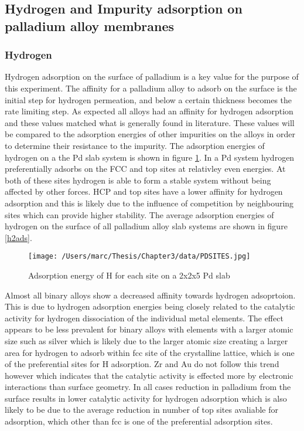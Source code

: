 \subsection{Hydrogen and Impurity adsorption on palladium alloy membranes}\label{Hsection}
\subsubsection{Hydrogen}
Hydrogen adsorption on the surface of palladium is a key value for the purpose of this experiment. The affinity for a palladium alloy to adsorb on the surface is the initial step for hydrogen permeation, and below a certain thickness becomes the rate limiting step. As expected all alloys had an affinity for hydrogen adsorption and these values matched what is generally found in literature. These values will be compared to the adsorption energies of other impurities on the alloys in order to determine their resistance to the impurity. The adsorption energies of hydrogen on a the Pd slab system is shown in figure \ref{Pdsite}. In a Pd system hydrogen preferentially adsorbs on the FCC and top sites at relativley even energies. At both of these sites hydrogen is able to form a stable system without being affected by other forces. HCP and top sites have a  lower affinity for hydrogen adsorption and this is likely due to the influence of competition by neighbouring sites which can provide higher stability. The average adsorption energies of hydrogen on the surface of all palladium alloy slab systems are shown in figure \ref{h2ads}.

\begin{figure}
  \centering
  \texttt{[image: /Users/marc/Thesis/Chapter3/data/PDSITES.jpg]}
  \caption{Adsorption energy of H for each site on a 2x2x5 Pd slab}
  \label{Pdsite}
\end{figure}

Almost all binary alloys show a decreased affinity towards hydrogen adsoprtoion. This is due to hydrogen adsorption energies being closely related to the catalytic activity for hydrogen dissociation of the individual metal elements. The effect appears to be less prevalent for binary alloys with elements with a larger atomic size such as silver which is likely due to the larger atomic size creating a larger area for hydrogen to adsorb within fcc site of the crystalline lattice, which is one of the preferential sites for H adsorption. Zr and Au do not follow this trend however which indicates that the catalytic activity is effected more by electronic interactions than surface geometry. In all cases reduction in palladium from the surface results in lower catalytic activity for hydrogen adsorption which is also likely to be due to the average reduction in number of top sites avaliable for adsorption, which other than fcc is one of the preferential adsorption sites. 

